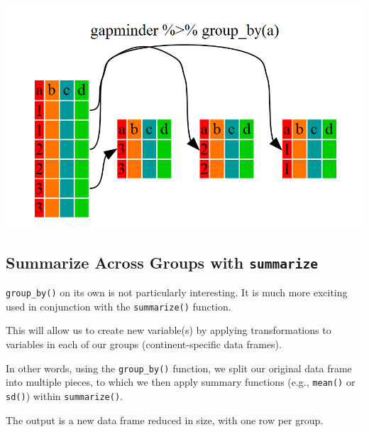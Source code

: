 \documentclass[
]{book}
\newenvironment{Shaded}{\begin{snugshade}}{\end{snugshade}}
\newcommand{\CommentTok}[1]{\textcolor[rgb]{0.56,0.35,0.01}{\textit{#1}}}
\newcommand{\DataTypeTok}[1]{\textcolor[rgb]{0.13,0.29,0.53}{#1}}
\newcommand{\KeywordTok}[1]{\textcolor[rgb]{0.13,0.29,0.53}{\textbf{#1}}}
\newcommand{\NormalTok}[1]{#1}
\newcommand{\OperatorTok}[1]{\textcolor[rgb]{0.81,0.36,0.00}{\textbf{#1}}}
\newcommand{\StringTok}[1]{\textcolor[rgb]{0.31,0.60,0.02}{#1}}
\begin{document}
\begin{center}\includegraphics[width=0.7\linewidth]{img/dplyr-fig2} \end{center}

\hypertarget{summarize-across-groups-with-summarize}{%
\subsection{\texorpdfstring{Summarize Across Groups with \texttt{summarize}}{Summarize Across Groups with summarize}}\label{summarize-across-groups-with-summarize}}

\texttt{group\_by()} on its own is not particularly interesting. It is much more exciting used in conjunction with the \texttt{summarize()} function.

This will allow us to create new variable(s) by applying transformations to variables in each of our groups (continent-specific data frames).

In other words, using the \texttt{group\_by()} function, we split our original data frame into multiple pieces, to which we then apply summary functions (e.g., \texttt{mean()} or \texttt{sd()}) within \texttt{summarize()}.

The output is a new data frame reduced in size, with one row per group.

\begin{Shaded}
\end{Shaded}
\end{document}
